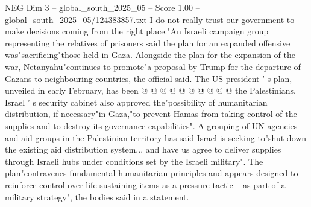\begin{textsample}{NEG Dim 3 – global\_south\_2025\_05 – Score 1.00 – global\_south\_2025\_05/124383857.txt}
I do not really trust our government to make decisions coming from the right place."An Israeli campaign group representing the relatives of prisoners said the plan for an expanded offensive was"sacrificing"those held in Gaza.
Alongside the plan for the expansion of the war, Netanyahu"continues to promote"a proposal by Trump for the departure of Gazans to neighbouring countries, the official said.
The US president ' s plan, unveiled in early February, has been @ @ @ @ @ @ @ @ @ @ the Palestinians.
Israel ' s security cabinet also approved the"possibility of humanitarian distribution, if necessary"in Gaza,"to prevent Hamas from taking control of the supplies and to destroy its governance capabilities".
A grouping of UN agencies and aid groups in the Palestinian territory has said Israel is seeking to"shut down the existing aid distribution system... and have us agree to deliver supplies through Israeli hubs under conditions set by the Israeli military".
The plan"contravenes fundamental humanitarian principles and appears designed to reinforce control over life-sustaining items as a pressure tactic -- as part of a military strategy", the bodies said in a statement.

\end{textsample}
